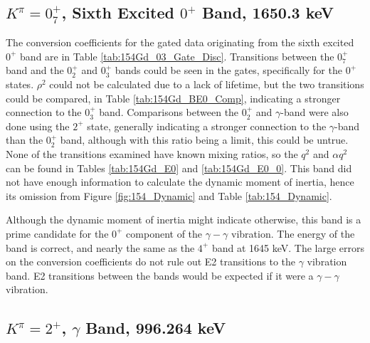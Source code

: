 



\subsection{$K^{\pi}=0^+_7$, Sixth Excited $0^+$ Band, 1650.3 keV}

The conversion coefficients for the gated data originating from the sixth excited $0^+$ band are in Table \ref{tab:154Gd_03_Gate_Disc}. Transitions between the $0^+_7$ band and the $0^+_2$ and $0^+_3$ bands could be seen in the gates, specifically for the $0^+$ states. $\rho^2$ could not be calculated due to a lack of lifetime, but the two transitions could be compared, in Table \ref{tab:154Gd_BE0_Comp}, indicating a stronger connection to the $0^+_3$ band. Comparisons between the $0^+_2$ and $\gamma$-band were also done using the $2^+$ state, generally indicating a stronger connection to the $\gamma$-band than the $0^+_2$ band, although with this ratio being a limit, this could be untrue. None of the transitions examined have known mixing ratios, so the $q^2$ and $\alpha q^2$ can be found in Tables \ref{tab:154Gd_E0} and \ref{tab:154Gd_E0_0}. This band did not have enough information to calculate the dynamic moment of inertia, hence its omission from Figure \ref{fig:154_Dynamic} and Table \ref{tab:154_Dynamic}.

Although the dynamic moment of inertia might indicate otherwise, this band is a prime candidate for the $0^+$ component of the $\gamma-\gamma$ vibration. The energy of the band is correct, and nearly the same as the $4^+$ band at 1645 keV. The large errors on the conversion coefficients do not rule out E2 transitions to the $\gamma$ vibration band. E2 transitions between the bands would be expected if it were a $\gamma-\gamma$ vibration.



\subsection{$K^{\pi}=2^+$, $\gamma$ Band, 996.264 keV}

